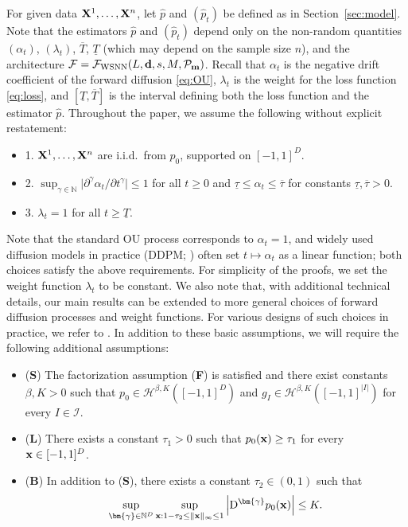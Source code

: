 \documentclass[twoside,11pt]{article}
\def\cF{\mathcal F}
\def\cH{\mathcal H}
\def\cI{\mathcal I}
\def\cP{\mathcal P}
\newcommand{\bB}{{\bf B}}
\newcommand{\bd}{{\bf d}}
\newcommand{\bF}{{\bf F}}
\newcommand{\bL}{{\bf L}}
\newcommand{\bfm}{{\bf m}}
\newcommand{\bS}{{\bf S}}
\newcommand{\bx}{{\bf x}}
\newcommand{\bX}{{\bf X}}
\newcommand{\bbN}{{\mathbb N}}
\newcommand{\bgamma}{\bm{\gamma}}
\newcommand{\iid}{{\rm i.i.d.}}
\newcommand{\bean}{\setlength\arraycolsep{1pt}\begin{eqnarray*}}
\newcommand{\eean}{\end{eqnarray*}}
\newcommand{\bed}{\begin{itemize}}
\newcommand{\eed}{\end{itemize}}
\def\D{{\rm D}}
\begin{document}
For given data $\bX^1, \ldots, \bX^n$, let $\widehat p$ and $(\widehat p_t)$ be defined as in Section~\ref{sec:model}.
Note that the estimators $\widehat p$ and $(\widehat p_t)$ depend only on the non-random quantities $(\alpha_{t})$, $(\lambda_t)$, $\overline{T}$, $\underline{T}$ (which may depend on the sample size $n$), and the architecture $\cF = \cF_{\rm WSNN}(L, \bd, s, M, \cP_{\bfm})$.
Recall that $\alpha_{t}$ is the negative drift coefficient of the forward diffusion \eqref{eq:OU}, $\lambda_t$ is the weight for the loss function \eqref{eq:loss}, and $[\underline{T}, \overline{T}]$ is the interval defining both the loss function and the estimator $\widehat p$.
Throughout the paper, we assume the following without explicit restatement:
\bed
 \item[]1. $\bX^1, \ldots, \bX^n$ are \iid\ from $p_0$, supported on $[-1,1]^{D}$.
 \item[]2. $\sup_{\gamma \in \bbN} \vert  \partial^{\gamma } \alpha_{t} / \partial {t}^{\gamma}  \vert \leq 1 $  for all $t \geq 0$ and $\underline{\tau} \leq \alpha_{t} \leq \overline{\tau}$ for constants $\underline{\tau}, \overline{\tau} > 0$.
 \item[]3. $\lambda_t = 1$ for all $t \geq \underline{T}$.
\eed

Note that the standard OU process corresponds to $\alpha_{t} = 1$, and widely used diffusion models in practice (DDPM; \citealp{ho2020denoising}) often set $t \mapsto \alpha_t$ as a linear function; both choices satisfy the above requirements. 
For simplicity of the proofs, we set the weight function $\lambda_t$ to be constant. 
We also note that, with additional technical details, our main results can be extended to more general choices of forward diffusion processes and weight functions. 
For various designs of such choices in practice, we refer to \citet{karras2022elucidating}.
In addition to these basic assumptions, we will require the following additional assumptions:

\bed
\item[](\bS) The factorization assumption (\bF) is satisfied and there exist constants $\beta, K > 0$ such that $p_0 \in \cH^{\beta,K}([-1,1]^{D})$ and $g_I\in \cH^{\beta,K}([-1,1]^{|I|})$ for every $I \in \cI$.
\item[](\bL) There exists a constant $\tau_{1} > 0$ such that $p_0(\bx) \geq \tau_{1}$ for every $\bx \in [-1,1]^{D}$.
\item[](\bB) In addition to (\bS), there exists a constant $\tau_{2} \in (0,1)$ such that
\bean
\sup_{\bgamma \in \bbN^{D}} \sup_{\bx: 1-\tau_{2} \leq \| \bx\|_{\infty} \leq 1  }  \left\vert \D^{\bgamma} p_0(\bx)  \right\vert \leq K.
\eean
\eed
\end{document}
